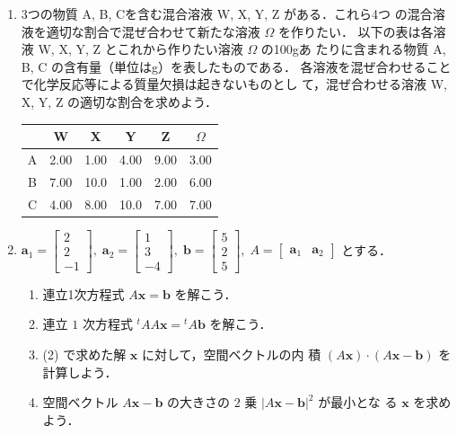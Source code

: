 \documentclass[11pt, uplatex, dvipdfmx]{jsarticle}
\begin{document}
\begin{enumerate}
\item 3つの物質 A, B, Cを含む混合溶液 W, X, Y, Z がある．これら4つ
  の混合溶液を適切な割合で混ぜ合わせて新たな溶液 $\Omega$ を作りたい．
  以下の表は各溶液 W, X, Y, Z とこれから作りたい溶液 $\Omega$ の100gあ
  たりに含まれる物質 A, B, C の含有量（単位はg）を表したものである．
  各溶液を混ぜ合わせることで化学反応等による質量欠損は起きないものとし
  て，混ぜ合わせる溶液 W, X, Y, Z の適切な割合を求めよう．
  \begin{table}[h]
    \centering
    \begin{tabular}{ccccc|c}
      & W & X & Y & Z & $\Omega$\\ \hline
      A & 2.00 & 1.00 & 4.00 & 9.00 & 3.00\\ \hline
      B & 7.00 & 10.0 & 1.00 & 2.00 & 6.00\\ \hline  
      C & 4.00 & 8.00 & 10.0 & 7.00 & 7.00\\ 
    \end{tabular}
  \end{table}

  
\item $\bm{a}_1 = \left[
    \begin{array}{r}
      2\\
      2\\
      -1
    \end{array}
  \right], \; \bm{a}_2=\left[
    \begin{array}{r}
      1\\
      3\\
      -4
    \end{array}
  \right], \; \bm{b} = \left[
    \begin{array}{r}
      5\\
      2\\
      5
    \end{array}
  \right], \; A=\left[
    \begin{array}{cc}
      \bm{a}_1 & \bm{a}_2
    \end{array}
  \right]$ とする．
  
  \vspace{1zh}

  
  \begin{enumerate}[(1)]
    \setlength{\itemsep}{1ex}
    
  \item 連立1次方程式 $A\bm{x} = \bm{b}$ を解こう．

  \item 連立 $1$ 次方程式 ${}^{t}A A\bm{x} = {}^{t}A \bm{b}$ を解こう．

  \item (2) で求めた解 $\bm{x}$ に対して，空間ベクトルの内
    積 $(A\bm{x}) \cdot (A\bm{x} -\bm{b})$ を計算しよう．

  \item 空間ベクトル $A\bm{x}-\bm{b}$ の大きさの $2$ 乗 $|A\bm{x} - \bm{b}|^2$ が最小とな
    る $\bm{x}$ を求めよう．
  \end{enumerate}
  
\end{enumerate}
\end{document}
